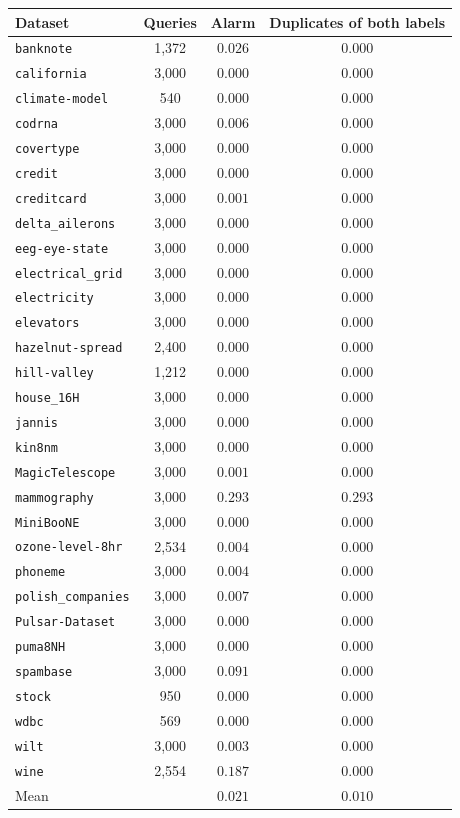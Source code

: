 \centering\scriptsize\begin{tabular}{@{}lccc@{}}\toprule
Dataset & Queries & Alarm & Duplicates of both labels \\ \midrule
\texttt{banknote} & 1,372 & $0.026$ & $0.000$ \\
\texttt{california} & 3,000 & $0.000$ & $0.000$ \\
\texttt{climate-model} & 540 & $0.000$ & $0.000$ \\
\texttt{codrna} & 3,000 & $0.006$ & $0.000$ \\
\texttt{covertype} & 3,000 & $0.000$ & $0.000$ \\
\texttt{credit} & 3,000 & $0.000$ & $0.000$ \\
\texttt{creditcard} & 3,000 & $0.001$ & $0.000$ \\
\texttt{delta\_ailerons} & 3,000 & $0.000$ & $0.000$ \\
\texttt{eeg-eye-state} & 3,000 & $0.000$ & $0.000$ \\
\texttt{electrical\_grid} & 3,000 & $0.000$ & $0.000$ \\
\texttt{electricity} & 3,000 & $0.000$ & $0.000$ \\
\texttt{elevators} & 3,000 & $0.000$ & $0.000$ \\
\texttt{hazelnut-spread} & 2,400 & $0.000$ & $0.000$ \\
\texttt{hill-valley} & 1,212 & $0.000$ & $0.000$ \\
\texttt{house\_16H} & 3,000 & $0.000$ & $0.000$ \\
\texttt{jannis} & 3,000 & $0.000$ & $0.000$ \\
\texttt{kin8nm} & 3,000 & $0.000$ & $0.000$ \\
\texttt{MagicTelescope} & 3,000 & $0.001$ & $0.000$ \\
\texttt{mammography} & 3,000 & $0.293$ & $0.293$ \\
\texttt{MiniBooNE} & 3,000 & $0.000$ & $0.000$ \\
\texttt{ozone-level-8hr} & 2,534 & $0.004$ & $0.000$ \\
\texttt{phoneme} & 3,000 & $0.004$ & $0.000$ \\
\texttt{polish\_companies} & 3,000 & $0.007$ & $0.000$ \\
\texttt{Pulsar-Dataset} & 3,000 & $0.000$ & $0.000$ \\
\texttt{puma8NH} & 3,000 & $0.000$ & $0.000$ \\
\texttt{spambase} & 3,000 & $0.091$ & $0.000$ \\
\texttt{stock} & 950 & $0.000$ & $0.000$ \\
\texttt{wdbc} & 569 & $0.000$ & $0.000$ \\
\texttt{wilt} & 3,000 & $0.003$ & $0.000$ \\
\texttt{wine} & 2,554 & $0.187$ & $0.000$ \\
\midrule
Mean & & $0.021$ & $0.010$ \\
\bottomrule\end{tabular}
